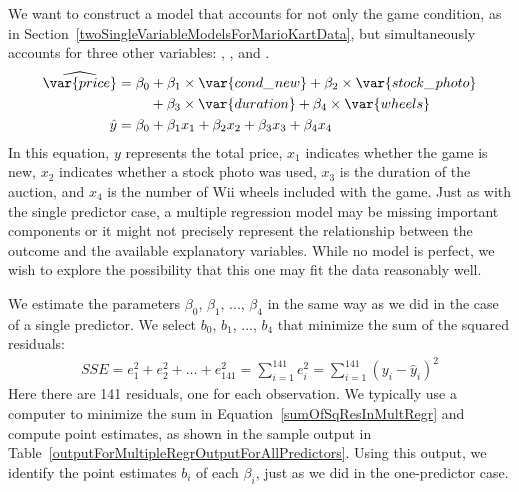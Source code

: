 We want to construct a model that accounts for not only the game condition, as in Section~\ref{twoSingleVariableModelsForMarioKartData}, but simultaneously accounts for three other variables: , , and .
\begin{align}
\widehat{\var{price}}
	&= \beta_0 + \beta_1\times \var{cond\_\hspace{0.3mm}new} +
		\beta_2\times \var{stock\_\hspace{0.3mm}photo} \notag \\
	&\qquad\  + \beta_3 \times  \var{duration} +
		\beta_4 \times  \var{wheels} \notag \\
\hat{y}
	&= \beta_0 + \beta_1 x_1 + \beta_2 x_2 +
		\beta_3 x_3 + \beta_4 x_4
\label{eqForMultipleRegrOfTotalPrForAllPredictors}
\end{align}
In this equation, $y$ represents the total price, $x_1$ indicates whether the game is new, $x_2$ indicates whether a stock photo was used, $x_3$ is the duration of the auction, and $x_4$ is the number of Wii wheels included with the game. Just as with the single predictor case, a multiple regression model may be missing important components or it might not precisely represent the relationship between the outcome and the available explanatory variables. While no model is perfect, we wish to explore the possibility that this one may fit the data reasonably well.

We estimate the parameters $\beta_0$, $\beta_1$, ..., $\beta_4$ in the same way as we did in the case of a single predictor. We select $b_0$, $b_1$, ..., $b_4$ that minimize the sum of the squared residuals:
\begin{align}\label{sumOfSqResInMultRegr}
SSE = e_1^2 + e_2^2 + \dots + e_{141}^2
	= \sum_{i=1}^{141} e_i^2
	 = \sum_{i=1}^{141} \left(y_i - \hat{y}_i\right)^2
\end{align}
Here there are 141 residuals, one for each observation. We typically use a computer to minimize the sum in Equation~\eqref{sumOfSqResInMultRegr} and compute point estimates, as shown in the sample output in Table~\ref{outputForMultipleRegrOutputForAllPredictors}. Using this output, we identify the point estimates $b_i$ of each $\beta_i$, just as we did in the one-predictor case.

